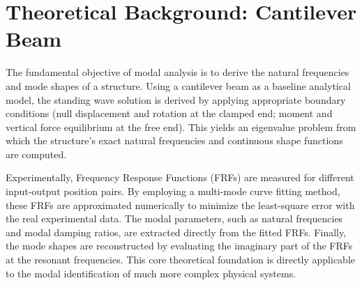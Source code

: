 \chapter*{Theoretical Background: Cantilever Beam}
The fundamental objective of modal analysis is to derive the natural frequencies and mode shapes of a structure. Using a cantilever beam as a baseline analytical model, the standing wave solution is derived by applying appropriate boundary conditions (null displacement and rotation at the clamped end; moment and vertical force equilibrium at the free end). This yields an eigenvalue problem from which the structure's exact natural frequencies and continuous shape functions are computed.

Experimentally, Frequency Response Functions (FRFs) are measured for different input-output position pairs. By employing a multi-mode curve fitting method, these FRFs are approximated numerically to minimize the least-square error with the real experimental data. The modal parameters, such as natural frequencies and modal damping ratios, are extracted directly from the fitted FRFs. Finally, the mode shapes are reconstructed by evaluating the imaginary part of the FRFs at the resonant frequencies. This core theoretical foundation is directly applicable to the modal identification of much more complex physical systems.

